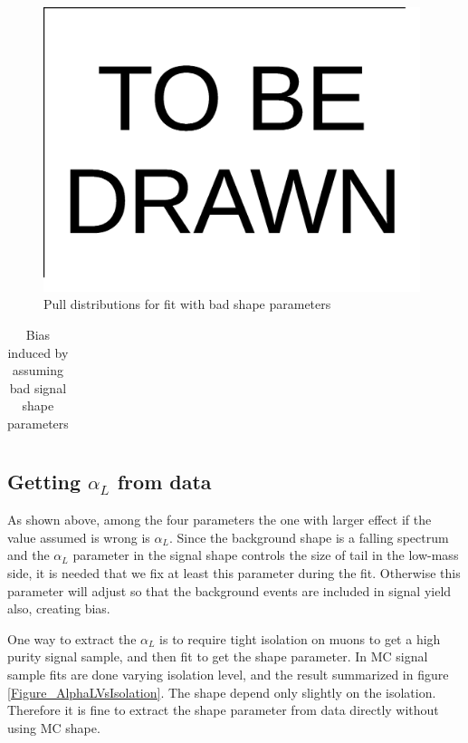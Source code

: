 \documentclass{cmspaper}
\begin{document}
\begin{figure}
   \centering
   \includegraphics[width=110mm]{TOBEDRAWN}
   \caption{Pull distributions for fit with bad shape parameters}
   \label{Figure_BadShapePulls}
\end{figure}

\begin{table}[htdp]
 \caption{Bias induced by assuming bad signal shape parameters}
 \centering
 \begin{tabular}{|c|c|c|c|c|c|}
 \hline
 \end{tabular}
 \label{Table_BadShapeSummary}
\end{table}

\subsection{Getting $\alpha_L$ from data}

As shown above, among the four parameters the one with larger effect if the value assumed is wrong is $\alpha_L$.
Since the background shape is a falling spectrum and the $\alpha_L$ parameter in the signal shape controls the size of tail in the low-mass side,
it is needed that we fix at least this parameter during the fit.
Otherwise this parameter will adjust so that the background events are included in signal yield also, creating bias.

One way to extract the $\alpha_L$ is to require tight isolation on muons to get a high purity signal sample, and then fit to get the shape parameter.
In MC signal sample fits are done varying isolation level, and the result summarized in figure \ref{Figure_AlphaLVsIsolation}.
The shape depend only slightly on the isolation.
Therefore it is fine to extract the shape parameter from data directly without using MC shape.
\end{document}
